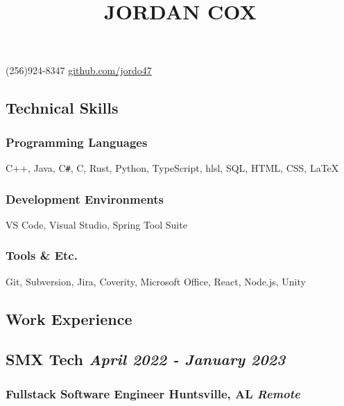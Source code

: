 \documentclass{article}
\begin{document}
\title{\vspace*{-4em}\textbf{JORDAN COX}}
\author{}
\date{}

\maketitle

\begin{center}
    \vspace*{-6em}
    (256)924-8347  \url{github.com/jordo47}
\end{center}

\subsection*{Technical Skills}
\subsubsection*{\hspace*{0.15cm} Programming Languages}
\hspace*{0.5cm} C++, Java, C\verb|#|, C, Rust, Python, TypeScript, hlsl, SQL, HTML, CSS, {\LaTeX}

\subsubsection*{\hspace*{0.15cm} Development Environments}
\hspace*{0.5cm} VS Code, Visual Studio, Spring Tool Suite

\subsubsection*{\hspace*{0.15cm} Tools \& Etc.}
\hspace*{0.5cm} Git, Subversion, Jira, Coverity, Microsoft Office, React, Node.js, Unity


\subsection*{Work Experience}

\subsection*{\hspace*{0.15cm} SMX Tech \hfill \textit{April 2022 - January 2023}}
\subsubsection*{\hspace*{0.15cm} Fullstack Software Engineer \hfill Huntsville, AL \textit{Remote}}
\end{document}

